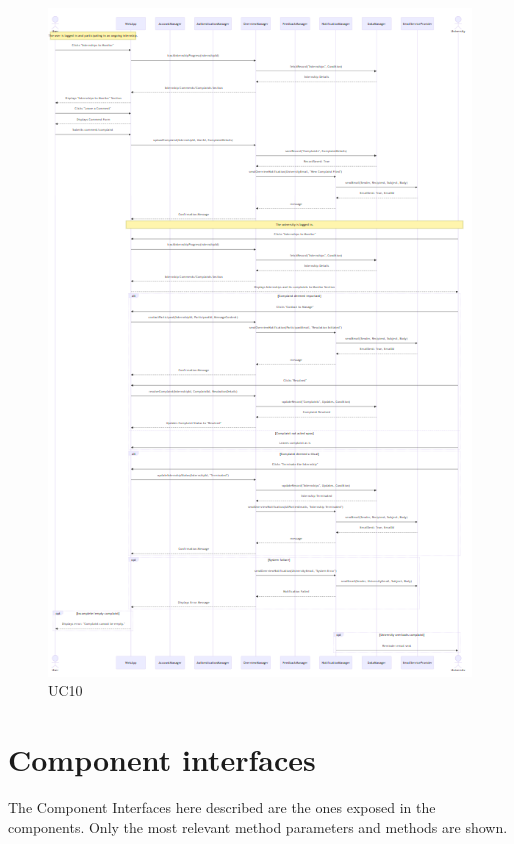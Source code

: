 \begin{figure}[H]
    \centering
    \includegraphics[width=1\linewidth]{DD//Images/SequenceDiagrams/UC10.png}
    \caption{UC10}
\end{figure}






\section{Component interfaces}
The Component Interfaces here described are the ones exposed in the components. Only the most relevant method parameters and methods
are shown.

